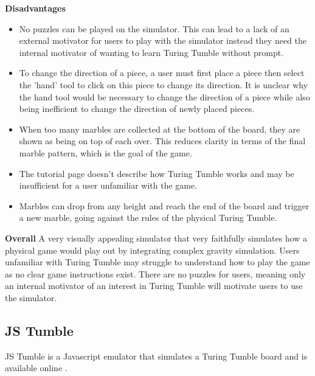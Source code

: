 \documentclass{l4proj}
\begin{document}
\textbf{Disadvantages}
\begin{itemize}
    \item No puzzles can be played on the simulator. This can lead to a lack of an external motivator for users to play with the simulator instead they need the internal motivator of wanting to learn Turing Tumble without prompt.
    \item To change the direction of a piece, a user must first place a piece then select the 'hand' tool to click on this piece to change its direction. It is unclear why the hand tool would be necessary to change the direction of a piece while also being inefficient to change the direction of newly placed pieces.
    \item When too many marbles are collected at the bottom of the board, they are shown as being on top of each over. This reduces clarity in terms of the final marble pattern, which is the goal of the game.
    \item The tutorial page doesn't describe how Turing Tumble works and may be insufficient for a user unfamiliar with the game.
    \item Marbles can drop from any height and reach the end of the board and trigger a new marble, going against the rules of the physical Turing Tumble.
\end{itemize}

\textbf{Overall}
A very visually appealing simulator that very faithfully simulates how a physical game would play out by integrating complex gravity simulation. Users unfamiliar with Turing Tumble may struggle to understand how to play the game as no clear game instructions exist. There are no puzzles for users, meaning only an internal motivator of an interest in Turing Tumble will motivate users to use the simulator.

\subsection{JS Tumble}
JS Tumble is a Javascript emulator that simulates a Turing Tumble board and is available online \cite{jstumble}.
\end{document}
